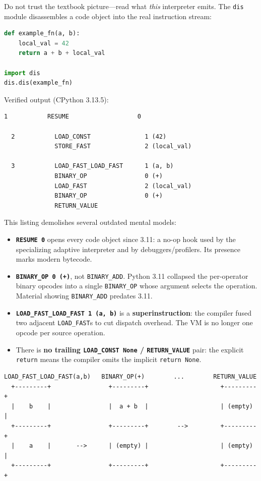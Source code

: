 Do not trust the textbook picture---read what \emph{this} interpreter emits. The \texttt{dis}
module disassembles a code object into the real instruction stream:

\begin{lstlisting}[language=Python, caption={The actual bytecode CPython 3.13 runs for example\_fn.}]
def example_fn(a, b):
    local_val = 42
    return a + b + local_val

import dis
dis.dis(example_fn)
\end{lstlisting}

Verified output (CPython 3.13.5):

\begin{lstlisting}[caption={Output}]
  1           RESUME                   0

  2           LOAD_CONST               1 (42)
              STORE_FAST               2 (local_val)

  3           LOAD_FAST_LOAD_FAST      1 (a, b)
              BINARY_OP                0 (+)
              LOAD_FAST                2 (local_val)
              BINARY_OP                0 (+)
              RETURN_VALUE
\end{lstlisting}

This listing demolishes several outdated mental models:

\begin{itemize}
  \item \textbf{\texttt{RESUME 0}} opens every code object since 3.11: a no-op hook used by
    the specializing adaptive interpreter and by debuggers/profilers. Its presence marks
    modern bytecode.
  \item \textbf{\texttt{BINARY\_OP 0 (+)}}, not \texttt{BINARY\_ADD}. Python 3.11 collapsed
    the per-operator binary opcodes into a single \texttt{BINARY\_OP} whose argument selects
    the operation. Material showing \texttt{BINARY\_ADD} predates 3.11.
  \item \textbf{\texttt{LOAD\_FAST\_LOAD\_FAST 1 (a, b)}} is a \textbf{superinstruction}: the
    compiler fused two adjacent \texttt{LOAD\_FAST}s to cut dispatch overhead. The VM is no
    longer one opcode per source operation.
  \item There is \textbf{no trailing \texttt{LOAD\_CONST None} / \texttt{RETURN\_VALUE}}
    pair: the explicit \texttt{return} means the compiler omits the implicit
    \texttt{return None}.
\end{itemize}

\begin{lstlisting}[caption={Evaluation-stack trace for a + b}]
  LOAD_FAST_LOAD_FAST(a,b)   BINARY_OP(+)        ...        RETURN_VALUE
  +---------+                +---------+                    +---------+
  |    b    |                |  a + b  |                    | (empty) |
  +---------+                +---------+        -->         +---------+
  |    a    |       -->      | (empty) |                    | (empty) |
  +---------+                +---------+                    +---------+
\end{lstlisting}


